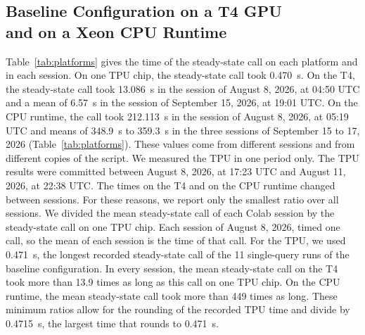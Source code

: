 \subsection{Baseline Configuration on a T4 GPU\\ and on a Xeon CPU Runtime}\label{sec:res-platforms}
Table~\ref{tab:platforms} gives the time of the steady-state call on each platform and in each session. On one TPU chip, the steady-state call took 0.470~s. %
On the T4, the steady-state call took 13.086~s in the session of August 8, 2026, at 04:50 UTC and a mean of 6.57~s in the session of September 15, 2026, at 19:01 UTC. %
On the CPU runtime, the call took 212.113~s in the session of August 8, 2026, at 05:19 UTC and means of 348.9~s to 359.3~s in the three sessions of September 15 to 17, 2026 (Table~\ref{tab:platforms}). %
These values come from different sessions and from different copies of the script. We measured the TPU in one period
only. The TPU results were committed between August 8, 2026, at 17:23 UTC and August 11, 2026, at 22:38 UTC. %
The times on the T4 and on the CPU runtime changed between sessions. For these reasons, we report only the smallest
ratio over all sessions. We divided the mean steady-state call of each Colab session by the steady-state call on one
TPU chip. Each session of August 8, 2026, timed one call, so the mean of each session is the time of that call. %
For the TPU, we used 0.471~s, the longest recorded steady-state call of the 11 single-query runs of the baseline configuration. %
In every session, the mean steady-state call on the T4 took more than 13.9 times as long as this call on one TPU chip. %
On the CPU runtime, the mean steady-state call took more than 449 times as long. %
These minimum ratios allow for the rounding of the recorded TPU time and divide by 0.4715~s, the largest time that rounds to 0.471~s. %
